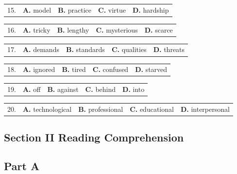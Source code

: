 \documentclass[UTF8,11pt]{ctexart}
\begin{document}
\noindent\begin{tabularx}{\linewidth}{@{}lXXXX@{}}15. & \textbf{A.} model & \textbf{B.} practice & \textbf{C.} virtue & \textbf{D.} hardship\\\end{tabularx}\par

\noindent\begin{tabularx}{\linewidth}{@{}lXXXX@{}}16. & \textbf{A.} tricky & \textbf{B.} lengthy & \textbf{C.} mysterious & \textbf{D.} scarce\\\end{tabularx}\par

\noindent\begin{tabularx}{\linewidth}{@{}lXXXX@{}}17. & \textbf{A.} demands & \textbf{B.} standards & \textbf{C.} qualities & \textbf{D.} threats\\\end{tabularx}\par

\noindent\begin{tabularx}{\linewidth}{@{}lXXXX@{}}18. & \textbf{A.} ignored & \textbf{B.} tired & \textbf{C.} confused & \textbf{D.} starved\\\end{tabularx}\par

\noindent\begin{tabularx}{\linewidth}{@{}lXXXX@{}}19. & \textbf{A.} off & \textbf{B.} against & \textbf{C.} behind & \textbf{D.} into\\\end{tabularx}\par

\noindent\begin{tabularx}{\linewidth}{@{}lXXXX@{}}20. & \textbf{A.} technological & \textbf{B.} professional & \textbf{C.} educational & \textbf{D.} interpersonal\\\end{tabularx}\par

\subsection*{\textbf{Section II Reading Comprehension}}


\subsection*{\textbf{Part A}}
\end{document}
